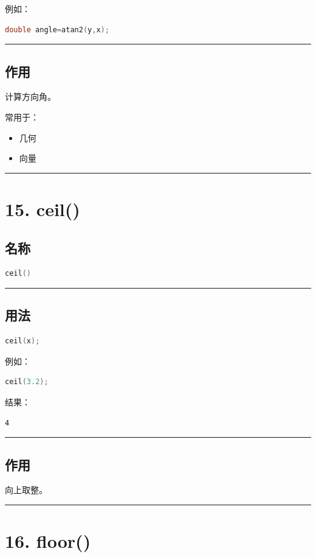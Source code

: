 \documentclass[10pt,twocolumn]{extarticle}
\begin{document}
例如：
\begin{lstlisting}[language=C++]
double angle=atan2(y,x);
\end{lstlisting}

\noindent\rule{\linewidth}{0.4pt}

\subsection{作用}
计算方向角。

常用于：
\begin{itemize}
    \item 几何
    \item 向量
\end{itemize}

\noindent\rule{\linewidth}{0.4pt}

\section{15. ceil()}

\subsection{名称}
\begin{lstlisting}[language=C++]
ceil()
\end{lstlisting}

\noindent\rule{\linewidth}{0.4pt}

\subsection{用法}
\begin{lstlisting}[language=C++]
ceil(x);
\end{lstlisting}
例如：
\begin{lstlisting}[language=C++]
ceil(3.2);
\end{lstlisting}
结果：
\begin{lstlisting}
4
\end{lstlisting}

\noindent\rule{\linewidth}{0.4pt}

\subsection{作用}
向上取整。

\noindent\rule{\linewidth}{0.4pt}

\section{16. floor()}
\end{document}
